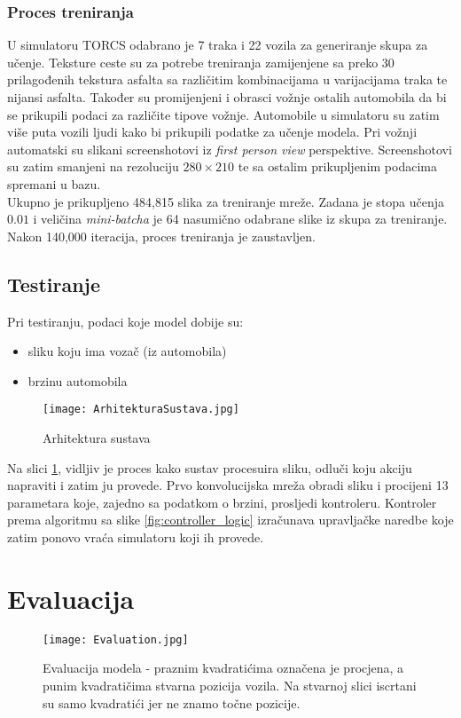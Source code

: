 \documentclass[seminar, utf8, numeric]{fer}
\begin{document}
\subsection{Proces treniranja}
U simulatoru TORCS odabrano je 7 traka i 22 vozila za generiranje skupa za učenje. Teksture ceste su za potrebe treniranja zamijenjene sa preko 30 prilagođenih tekstura asfalta sa različitim kombinacijama u varijacijama traka te nijansi asfalta. Također su promijenjeni i obrasci vožnje ostalih automobila da bi se prikupili podaci za različite tipove vožnje.
Automobile u simulatoru su zatim više puta vozili ljudi kako bi prikupili podatke za učenje modela. Pri vožnji automatski su slikani screenshotovi iz  \textit{first person view} perspektive. Screenshotovi su zatim smanjeni na rezoluciju $280\times210$ te sa ostalim prikupljenim podacima spremani u bazu. \\
Ukupno je prikupljeno 484,815 slika za treniranje mreže. Zadana je stopa učenja $0.01$ i veličina \textit{mini-batcha} je 64 nasumično odabrane slike iz skupa za treniranje. Nakon 140,000 iteracija, proces treniranja je zaustavljen. 

\section{Testiranje}
Pri testiranju, podaci koje model dobije su:
\begin{itemize}
	\item sliku koju ima vozač (iz automobila)
	\item brzinu automobila
\end{itemize}

\begin{figure}[htp]
\centering
\texttt{[image: ArhitekturaSustava.jpg]}
\caption{Arhitektura sustava}
\label{fig:sys_arh}
\end{figure}

Na slici \ref{fig:sys_arh}, \cite{deepDrive} vidljiv je proces kako sustav procesuira sliku, odluči koju akciju napraviti i zatim ju provede. Prvo konvolucijska mreža obradi sliku i procijeni 13 parametara koje, zajedno sa podatkom o brzini, prosljedi kontroleru. Kontroler prema algoritmu sa slike \ref{fig:controller_logic} izračunava upravljačke naredbe koje zatim ponovo vraća simulatoru koji ih provede.

\chapter{Evaluacija}
\begin{figure}[htp]
\centering
\texttt{[image: Evaluation.jpg]}
\caption{Evaluacija modela - praznim kvadratićima označena je procjena, a punim kvadratičima stvarna pozicija vozila. Na stvarnoj slici iscrtani su samo kvadratići jer ne znamo točne pozicije.}
\label{fig:evaluate_model}
\end{figure}
\end{document}
